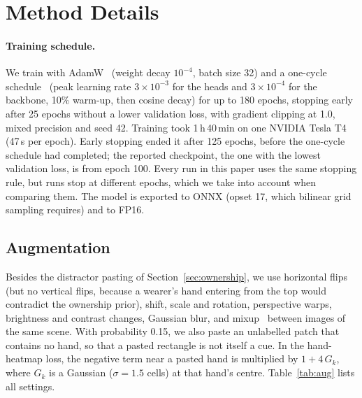 \section{Method Details}\label{app:method}
\paragraph{Training schedule.} We train with AdamW~\cite{loshchilov2019decoupled} (weight decay $10^{-4}$, batch size 32) and a one-cycle schedule~\cite{smith2019super} (peak learning rate $3\times10^{-3}$ for the heads and $3\times10^{-4}$ for the backbone, 10\% warm-up, then cosine decay) for up to 180 epochs, stopping early after 25 epochs without a lower validation loss, with gradient clipping at 1.0, mixed precision and seed 42. Training took 1\,h\,40\,min on one NVIDIA Tesla T4 (47\,s per epoch). Early stopping ended it after 125 epochs, before the one-cycle schedule had completed; the reported checkpoint, the one with the lowest validation loss, is from epoch 100. Every run in this paper uses the same stopping rule, but runs stop at different epochs, which we take into account when comparing them. The model is exported to ONNX (opset 17, which bilinear grid sampling requires) and to FP16.

\subsection{Augmentation}\label{app:aug}
Besides the distractor pasting of Section~\ref{sec:ownership}, we use horizontal flips (but no vertical flips, because a wearer's hand entering from the top would contradict the ownership prior), shift, scale and rotation, perspective warps, brightness and contrast changes, Gaussian blur, and mixup~\cite{zhang2018mixup} between images of the same scene. With probability 0.15, we also paste an unlabelled patch that contains no hand, so that a pasted rectangle is not itself a cue. In the hand-heatmap loss, the negative term near a pasted hand is multiplied by $1+4\,G_k$, where $G_k$ is a Gaussian ($\sigma{=}1.5$ cells) at that hand's centre. Table~\ref{tab:aug} lists all settings.

